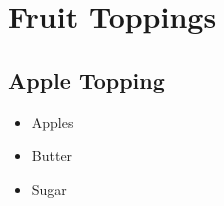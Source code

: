 \thispagestyle{fancy}
\section{Fruit Toppings}
\AddToShipoutPicture*{\FruitTopping}

\subsection*{Apple Topping}
\begin{multicols}{3}
	\begin{itemize}
		\item Apples
		\item Butter
		\item Sugar
	\end{itemize}
\end{multicols}



